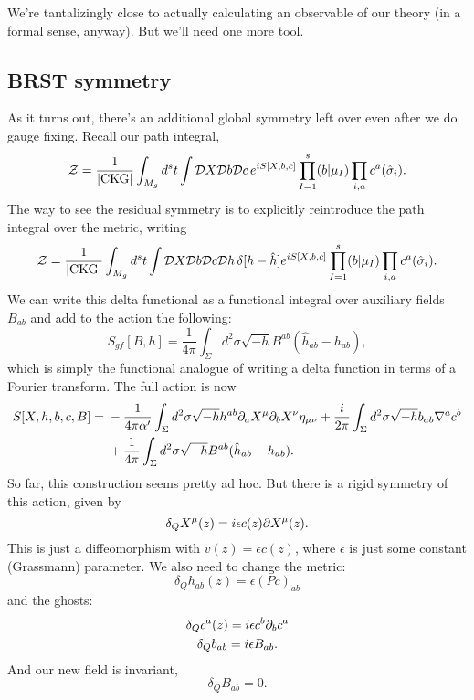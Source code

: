 We're tantalizingly close to actually calculating an observable of our theory (in a formal sense, anyway). But we'll need one more tool.

\subsection*{BRST symmetry}
As it turns out, there's an additional global symmetry left over even after we do gauge fixing. Recall our path integral,
\begin{equation}
    \mathcal{Z} = \frac{1}{\lvert\text{CKG}\rvert}\int_{M_g} d^st \int \mathcal{D} X \mathcal{D} b \mathcal{D} c \, e^{iS[X,b,c]}\prod_{I=1}^s (b|\mu_I) \prod_{i,a} c^a(\hat \sigma_i).
\end{equation}
The way to see the residual symmetry is to explicitly reintroduce the path integral over the metric, writing
\begin{equation}
    \mathcal{Z} = \frac{1}{\lvert\text{CKG}\rvert}\int_{M_g} d^st \int \mathcal{D} X \mathcal{D} b \mathcal{D} c \mathcal{D} h \, \delta[h-\hat h] e^{iS[X,b,c]}\prod_{I=1}^s (b|\mu_I) \prod_{i,a} c^a(\hat \sigma_i).
\end{equation}
We can write this delta functional as a functional integral over auxiliary fields $B_{ab}$ and add to the action the following:
\begin{equation}
    S_{gf}[B,h]=\frac{1}{4\pi} \int_\Sigma d^2 \sigma \sqrt{-h}B^{ab}(\hat h_{ab}-h_{ab}),
\end{equation}
which is simply the functional analogue of writing a delta function in terms of a Fourier transform. The full action is now
\begin{align}
    S[X,h,b,c,B]={}&-\frac{1}{4\pi \alpha'} \int_\Sigma d^2\sigma \sqrt{-h}h^{ab}\partial_a X^\mu \partial_b X^\nu \eta_{\mu\nu}+\frac{i}{2\pi}\int_\Sigma d^2\sigma \sqrt{-h}b_{ab} \nabla^a c^b\nonumber\\
    &+\frac{1}{4\pi}\int_\Sigma d^2\sigma \sqrt{-h} B^{ab}(\hat h_{ab}-h_{ab}).\label{brstaction}
\end{align}
So far, this construction seems pretty ad hoc. But there is a rigid symmetry of this action, given by
\begin{equation}
    \delta_Q X^\mu(z)=i\epsilon c(z) \partial X^\mu(z).
\end{equation}
This is just a diffeomorphism with $v(z)=\epsilon c(z)$, where $\epsilon$ is just some constant (Grassmann) parameter. We also need to change the metric:
\begin{equation}
    \delta_Q h_{ab}(z) = \epsilon(Pc)_{ab}
\end{equation}
and the ghosts:
\begin{gather}
    \delta_Q c^a(z) = i\epsilon c^b \partial_b c^a\\
    \delta_Q b_{ab} = i\epsilon B_{ab}.
\end{gather}
And our new field is invariant,
\begin{equation}
    \delta_Q B_{ab}=0.
\end{equation}

